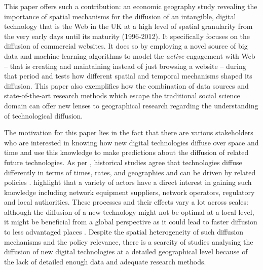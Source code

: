 \documentclass[
  authoryear,
  preprint,
  3p]{elsarticle}
\begin{document}
This paper offers such a contribution: an economic geography study
revealing the importance of spatial mechanisms for the diffusion of an
intangible, digital technology that is the Web in the UK at a high level
of spatial granularity from the very early days until its maturity
(1996-2012). It specifically focuses on the diffusion of commercial
websites. It does so by employing a novel source of big data and machine
learning algorithms to model the \emph{active} engagement with Web --
that is creating and maintaining instead of just browsing a website --
during that period and tests how different spatial and temporal
mechanisms shaped its diffusion. This paper also exemplifies how the
combination of data sources and state-of-the-art research methods which
escape the traditional social science domain can offer new lenses to
geographical research regarding the understanding of technological
diffusion.

The motivation for this paper lies in the fact that there are various
stakeholders who are interested in knowing how new digital technologies
diffuse over space and time and use this knowledge to make predictions
about the diffusion of related future technologies. As per
\citet{leibowicz2016representing}, historical studies agree that
technologies diffuse differently in terms of times, rates, and
geographies and can be driven by related policies \citep{victor1993}.
\citet{meade2021modelling} highlight that a variety of actors have a
direct interest in gaining such knowledge including network equipment
suppliers, network operators, regulatory and local authorities. These
processes and their effects vary a lot across scales: although the
diffusion of a new technology might not be optimal at a local level, it
might be beneficial from a global perspective as it could lead to faster
diffusion to less advantaged places \citep{leibowicz2016representing}.
Despite the spatial heterogeneity of such diffusion mechanisms and the
policy relevance, there is a scarcity of studies analysing the diffusion
of new digital technologies at a detailed geographical level because of
the lack of detailed enough data and adequate research methods.
\end{document}
